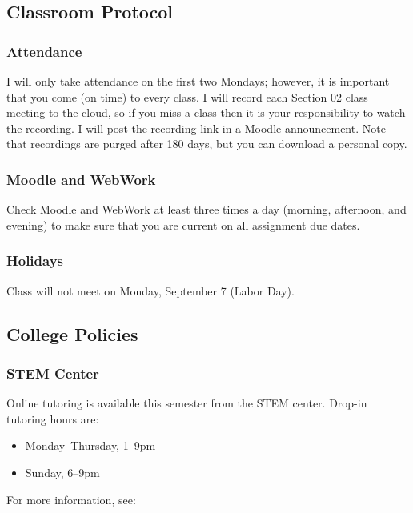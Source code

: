 \documentclass[letterpaper,12pt,fleqn]{article}
\begin{document}
\subsection*{Classroom Protocol}
  
\subsubsection*{Attendance}

I will only take attendance on the first two Mondays; however, it is important that you come (on time) to every
class.  I will record each Section 02 class meeting to the cloud, so if you miss a class then it is your
responsibility to watch the recording.  I will post the recording link in a Moodle announcement.  Note that
recordings are purged after 180 days, but you can download a personal copy.

\subsubsection*{Moodle and WebWork}

Check Moodle and WebWork at least three times a day (morning, afternoon, and evening) to make sure that you are
current on all assignment due dates.

\subsubsection*{Holidays}

Class will not meet on Monday, September 7 (Labor Day).

\subsection*{College Policies}

\subsubsection*{STEM Center}

Online tutoring is available this semester from the STEM center.  Drop-in tutoring hours are:

\begin{itemize}
\item Monday--Thursday, 1--9pm
\item Sunday, 6--9pm
\end{itemize}

For more information, see:
\end{document}
